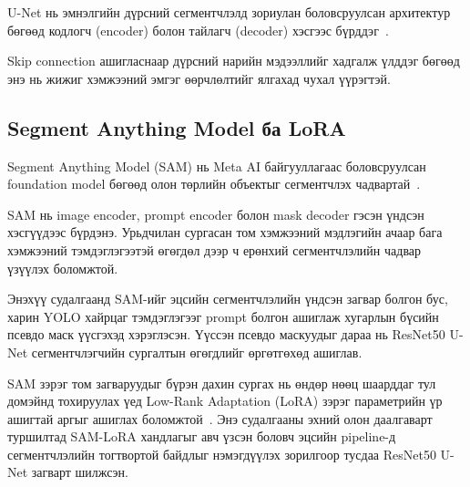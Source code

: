 U-Net нь эмнэлгийн дүрсний сегментчлэлд зориулан боловсруулсан архитектур бөгөөд кодлогч (encoder) болон тайлагч (decoder) хэсгээс бүрддэг~\cite{ronneberger2015unet}.

Skip connection ашигласнаар дүрсний нарийн мэдээллийг хадгалж үлддэг бөгөөд энэ нь жижиг хэмжээний эмгэг өөрчлөлтийг ялгахад чухал үүрэгтэй.

\subsection*{Segment Anything Model ба LoRA}

\begin{figure}[H]
    \centering
    \label{fig:sam}
\end{figure}

Segment Anything Model (SAM) нь Meta AI байгууллагаас боловсруулсан foundation model бөгөөд олон төрлийн объектыг сегментчлэх чадвартай~\cite{ref32}.

SAM нь image encoder, prompt encoder болон mask decoder гэсэн үндсэн хэсгүүдээс бүрдэнэ. Урьдчилан сургасан том хэмжээний мэдлэгийн ачаар бага хэмжээний тэмдэглэгээтэй өгөгдөл дээр ч ерөнхий сегментчлэлийн чадвар үзүүлэх боломжтой.

Энэхүү судалгаанд SAM-ийг эцсийн сегментчлэлийн үндсэн загвар болгон бус, харин YOLO хайрцаг тэмдэглэгээг prompt болгон ашиглаж хугарлын бүсийн псевдо маск үүсгэхэд хэрэглэсэн. Үүссэн псевдо маскуудыг дараа нь ResNet50 U-Net сегментчлэгчийн сургалтын өгөгдлийг өргөтгөхөд ашиглав.

\begin{figure}[H]
    \centering
    \label{fig:lora}
\end{figure}

SAM зэрэг том загваруудыг бүрэн дахин сургах нь өндөр нөөц шаарддаг тул домэйнд тохируулах үед Low-Rank Adaptation (LoRA) зэрэг параметрийн үр ашигтай аргыг ашиглах боломжтой~\cite{hu2022lora}. Энэ судалгааны эхний олон даалгаварт туршилтад SAM-LoRA хандлагыг авч үзсэн боловч эцсийн pipeline-д сегментчлэлийн тогтвортой байдлыг нэмэгдүүлэх зорилгоор тусдаа ResNet50 U-Net загварт шилжсэн.

